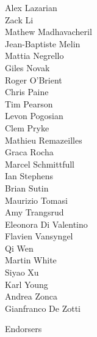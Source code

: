 \documentclass[PICOReport.tex]{subfiles}
\begin{document}
{\begin{multicols}{4}
Alex Lazarian    \\
Zack Li    \\
Mathew Madhavacheril    \\
Jean-Baptiste Melin    \\
Mattia Negrello    \\
Giles Novak    \\
Roger O'Brient    \\
Chris Paine    \\
Tim Pearson    \\
Levon Pogosian    \\
Clem Pryke    \\
Mathieu Remazeilles    \\
Graca Rocha    \\
Marcel Schmittfull    \\
Ian Stephens    \\
Brian Sutin    \\
Maurizio Tomasi    \\
Amy Trangsrud    \\
Eleonora Di Valentino    \\
Flavien Vansyngel    \\
Qi Wen    \\
Martin White    \\
Siyao Xu    \\
Karl Young    \\
Andrea Zonca    \\
Gianfranco De Zotti    
\end{multicols}
}

\Large { \centerline {Endorsers}}
\end{document}
